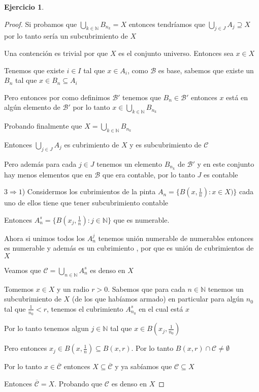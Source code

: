 \documentclass[12pt]{report}
\newcommand{\N}{\mathbb{N}}
\newcommand{\Ra}{\Rightarrow}
\newcommand{\ol}{\overline}
\theoremstyle{definition}
\newtheorem{ej}{Ejercicio}
\begin{document}
\begin{ej}
\begin{proof}
		Si probamos que $\bigcup_{k\in\N} B_{n_k} = X$ entonces tendríamos que $\bigcup_{j \in J} A_j \supseteq X$ por lo tanto sería un subcubrimiento de $X$

		Una contención es trivial por que $X$ es el conjunto universo. Entonces sea $x \in X$

		Tenemos que existe $i \in I$ tal que $x \in A_i$, como $\mathcal{B}$ es base, sabemos que existe un $B_n$ tal que $x \in B_n \subseteq A_i$

		Pero entonces por como definimos $\mathcal{B}'$ tenemos que $B_n \in \mathcal{B} '$ entonces $x$ está en algún elemento de $\mathcal{B'}$ por lo tanto $x \in \bigcup_{k\in\N} B_{n_k}$

		Probando finalmente que $X = \bigcup_{k \in \N} B_{n_k}$

		Entonces $\bigcup_{j \in J} A_j$ es cubrimiento de $X$ y es subcubrimiento de $\mathcal{C}$

		Pero además para cada $j \in J$ tenemos un elemento $B_{n_k}$ de $\mathcal{B}'$ y en este conjunto hay menos elementos que en $\mathcal{B}$ que era contable, por lo tanto $J$ es contable

		$3 \Ra 1$) Considermos los cubrimientos de la pinta $A_n = \{B(x,\frac{1}{n}): x \in X)\}$ cada uno de ellos tiene que tener subcubrimiento contable

		Entonces $A_n^s = \{B(x_j,\frac{1}{n}) :  j \in \N\}$ que es numerable.

		Ahora si unimos todos los $A_n^j$ tenemos unión numerable de numerables entonces es numerable y además es un cubrimiento , por que es unión de cubrimientos de $X$

		Veamos que $\mathcal{C} = \bigcup_{n\in\N} A_n^s$ es denso en $X$

		Tomemos $x \in X$ y un radio $r>0$. Sabemos que para cada $n \in \N$ tenemos un subcubrimiento de $X$ (de los que habíamos armado) en particular para algún $n_0$ tal que $\frac{1}{n_0} < r$, tenemos el cubrimiento $A_{n_0}^s$ en el cual está $x$

		Por lo tanto tenemos algun $j \in \N$ tal que $x \in B(x_j,\frac{1}{n_0})$

		Pero entonces $x_j \in B(x,\frac{1}{n}) \subseteq B(x,r)$. Por lo tanto $B(x,r)\cap \mathcal{C} \neq \emptyset$

		Por lo tanto $x \in \ol{\mathcal{C}}$ entonces $X \subseteq \ol{\mathcal{C}}$ y ya sabíamos que $\mathcal{C} \subseteq X$

		Entonces $\ol{\mathcal{C}} = X$. Probando que $\mathcal{C}$ es denso en $X$
	\end{proof}
	
	
\end{ej}
\end{document}
